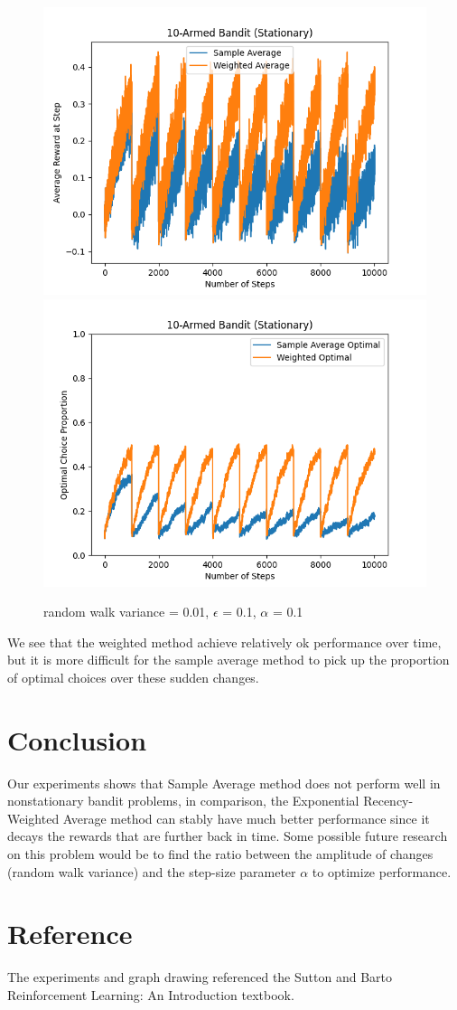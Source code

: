 \documentclass{article}
\begin{document}
\begin{figure}[h!]
\centering
\includegraphics[scale=.6]{RL_A1_pics/sudden/1000.png}
\includegraphics[scale=.6]{RL_A1_pics/sudden/optimal/Figure_1.png}
\caption{random walk variance = 0.01, $\epsilon$ = 0.1, $\alpha$ = 0.1}
\label{fig:10-Armed1}
\end{figure}

\newpage
We see that the weighted method achieve relatively ok performance over time, but it is more difficult for the sample average method to pick up the proportion of optimal choices over these sudden changes. 

\newpage
\section{Conclusion}
Our experiments shows that Sample Average method does not perform well in nonstationary bandit problems, in comparison, the Exponential Recency-Weighted Average method can stably have much better performance since it decays the rewards that are further back in time. Some possible future research on this problem would be to find the ratio between the amplitude of changes (random walk variance) and the step-size parameter $\alpha$ to optimize performance.

\section{Reference}
The experiments and graph drawing referenced the Sutton and Barto Reinforcement Learning: An Introduction textbook.



\end{document}
